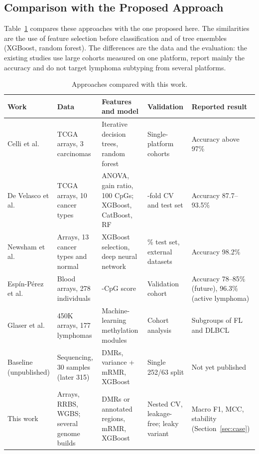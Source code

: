 \documentclass[runningheads]{llncs}
\begin{document}
\subsection{Comparison with the Proposed Approach}
Table~\ref{tab:related} compares these approaches with the one proposed here. The similarities are the use of feature selection before classification and of tree ensembles (XGBoost, random forest). The differences are the data and the evaluation: the existing studies use large cohorts measured on one platform, report mainly the accuracy and do not target lymphoma subtyping from several platforms.

\begin{table}[!htb]
\centering
\caption{Approaches compared with this work.}
\label{tab:related}
\small
\begin{tabular}{>{\raggedright\arraybackslash}p{2.2cm}>{\raggedright\arraybackslash}p{3.0cm}>{\raggedright\arraybackslash}p{3.5cm}>{\raggedright\arraybackslash}p{2.5cm}>{\raggedright\arraybackslash}p{2.6cm}}
\toprule
Work & Data & Features and model & Validation & Reported result \\
\midrule
Celli et al.~\cite{celli2018} & TCGA arrays, 3 carcinomas & Iterative decision trees, random forest & Single-platform cohorts & Accuracy above 97\% \\
De Velasco et al.~\cite{develasco2024} & 890 TCGA arrays, 10 cancer types & ANOVA, gain ratio, 100 CpGs; XGBoost, CatBoost, RF & 5-fold CV and test set & Accuracy 87.7--93.5\% \\
Newsham et al.~\cite{newsham2024} & Arrays, 13 cancer types and normal & XGBoost selection, deep neural network & 25\% test set, external datasets & Accuracy 98.2\% \\
Espín-Pérez et al.~\cite{espinperez2022} & Blood arrays, 278 individuals & 135-CpG score & Validation cohort & Accuracy 78--85\% (future), 96.3\% (active lymphoma) \\
Glaser et al.~\cite{glaser2025} & 450K arrays, 177 lymphomas & Machine-learning methylation modules & Cohort analysis & Subgroups of FL and DLBCL \\
Baseline (unpublished) & Sequencing, 30 samples (later 315) & DMRs, variance + mRMR, XGBoost & Single 252/63 split & Not yet published \\
This work & Arrays, RRBS, WGBS; several genome builds & DMRs or annotated regions, mRMR, XGBoost & Nested CV, leakage-free; leaky variant & Macro F1, MCC, stability (Section~\ref{sec:case}) \\
\bottomrule
\end{tabular}
\end{table}
\end{document}
